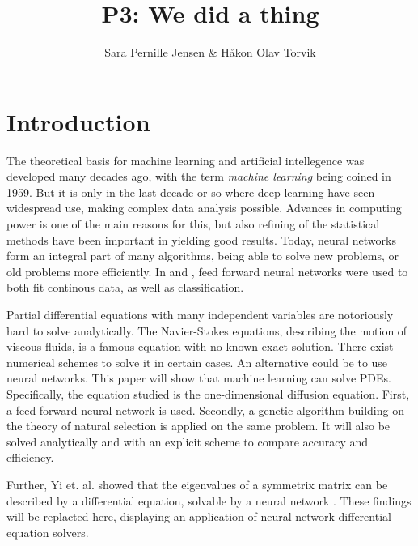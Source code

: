 \documentclass[multicolumn, 12pt]{extarticle}
\author{\Large Sara Pernille Jensen \& Håkon Olav Torvik}
\title{\Huge P3: We did a thing}
\affiliation{\large FYS-STK4155 – Applied Data Analysis and Machine Learning
\\Autumn 2021\\Department of Physics\\University of Oslo\\\\\today}
\begin{document}



\maketitle

\pagestyle{myplain}


\twocolumn
\section{Introduction}

The theoretical basis for machine learning and artificial intellegence was developed many decades ago, with the term \textit{machine learning} being coined in 1959. But it is only in the last decade or so where deep learning have seen widespread use, making complex data analysis possible. Advances in computing power is one of the main reasons for this, but also refining of the statistical methods have been important in yielding good results. Today, neural networks form an integral part of many algorithms, being able to solve new problems, or old problems more efficiently. In \cite{p2S} and \cite{p2HO}, feed forward neural networks were used to both fit continous data, as well as classification.

Partial differential equations with many independent variables are notoriously hard to solve analytically. The Navier-Stokes equations, describing the motion of viscous fluids, is a famous equation with no known exact solution. There exist numerical schemes to solve it in certain cases. An alternative could be to use neural networks. This paper will show that machine learning can solve PDEs. Specifically, the equation studied is the one-dimensional diffusion equation. First, a feed forward neural network is used. Secondly, a genetic algorithm building on the theory of natural selection is applied on the same problem. It will also be solved analytically and with an explicit scheme to compare accuracy and efficiency.

Further, Yi et. al. showed that the eigenvalues of a symmetrix matrix can be described by a differential equation, solvable by a neural network \cite{symmetric}. These findings will be replacted here, displaying an application of neural network-differential equation solvers.
\end{document}
